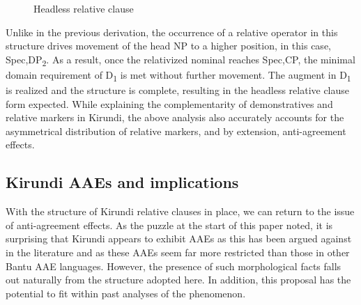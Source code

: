 \documentclass[output=paper,colorlinks,citecolor=brown
]{langscibook}
\begin{document}
\begin{figure}
\caption{Headless relative clause}
  \label{fig:myers:headless}
\end{figure}

\noindent Unlike in the previous derivation, the occurrence of a relative operator in this structure drives movement of the head NP to a higher position, in this case, Spec,DP\textsubscript{2}. As a result, once the relativized nominal reaches Spec,CP, the minimal domain requirement of D\textsubscript{1} is met without further movement. The augment in D\textsubscript{1} is realized and the structure is complete, resulting in the headless relative clause form expected. While explaining the complementarity of demonstratives and relative markers in Kirundi, the above analysis also accurately accounts for the asymmetrical distribution of relative markers, and by extension, anti-agreement effects.


\subsection{Kirundi AAEs and implications} \label{sec:myers:implications}

With the structure of Kirundi relative clauses in place, we can return to the issue of anti-agreement effects. As the puzzle at the start of this paper noted, it is surprising that Kirundi appears to exhibit AAEs as this has been argued against in the literature and as these AAEs seem far more restricted than those in other Bantu AAE languages. However, the presence of such morphological facts falls out naturally from the structure adopted here. In addition, this proposal has the potential to fit within past analyses of the phenomenon.
\end{document}
